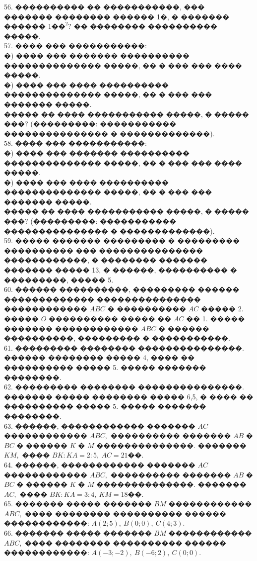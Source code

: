 \documentclass[12pt]{article}
\begin{document}
56. ���������� �� �����������, ��� ������� �������� ������ 1�, � ������� ������ $1\text{��}^2?$ �� �������� ���������� �����.\\
57. ���� ��� �����������:\\
�) ���� ��� ������� ���������� �������������� �����, �� � ��� ��� ���� �����.\\
�) ���� ��� ���� ���������� �������������� �����, �� � ��� ��� ������� �����.\\
����� �� ���� ����������� �����, � ����� ���? (���������: ����������� ��������������� � �������������).\\
58. ���� ��� �����������:\\
�) ���� ��� ������� ���������� �������������� �����, �� � ��� ��� ���� �����.\\
�) ���� ��� ���� ���������� �������������� �����, �� � ��� ��� ������� �����.\\
����� �� ���� ����������� �����, � ����� ���? (���������: ����������� ��������������� � �������������).\\
59. ����� ������� ��������� � ��������� ���������� ��� ��������������� ������������, � �������� ������� ������� ����� 13, � ������, ���������� � ���������, ����� 5.\\
60. ������ ����������, ��������� ������ ������������� ��������������� ������������ $ABC$ � ���������� $AC$ ����� 2. ����� $O$ ���������� ����� �� $AC$ �� 1. ����� ������� ������������ $ABC$ � ������ ����������, ��������� � �����������.\\
61. ��������� �������� ���������������. ������ �������� ����� 4, ���� �� ���������� ����� 5. ����� ������� ��������.\\
62. ��������� �������� ���������������. ������� ����� �������� ����� 6,5, � ���� �� ���������� ����� 5. ����� ������� ��������.\\
63. ������, ������������ ������� $AC$ ������������ $ABC,$ ���������� ������� $AB$ � $BC$ � ������ $K$ � $M$ ��������������. ������� $KM,$ ���� $BK:KA=2:5,\ AC=21$��.\\
64. ������, ������������ ������� $AC$ ������������ $ABC,$ ���������� ������� $AB$ � $BC$ � ������ $K$ � $M$ ��������������. ������� $AC,$ ���� $BK:KA=3:4,\ KM=18$��.\\
65. ������� ����� ������� $BM$ ������������ $ABC,$ ���� �������� ���������� ������ ������������: $A(2;5),\ B(0;0),\ C(4;3).$\\
66. ������� ����� ������� $BM$ ������������ $ABC,$ ���� �������� ���������� ������ ������������: $A(-3;-2),\ B(-6;2),\ C(0;0).$\\
\end{document}
